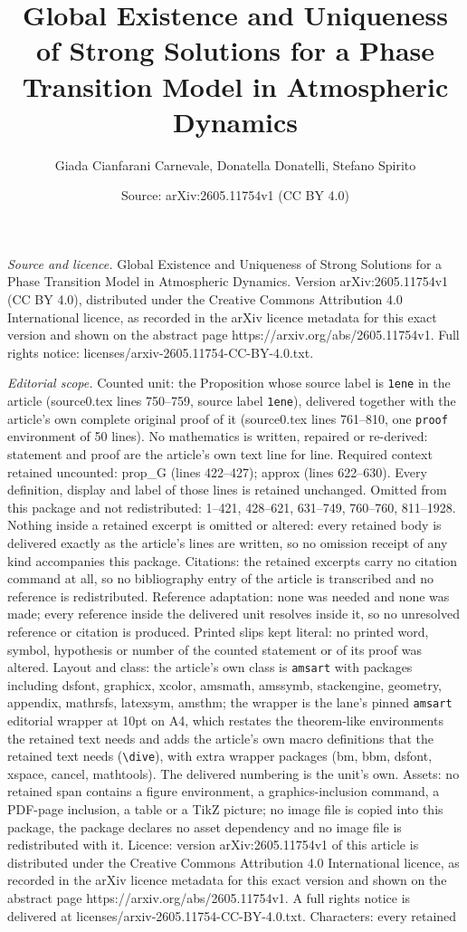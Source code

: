 \documentclass[10pt,a4paper]{amsart}
\title[Global Existence and Uniqueness of Strong Solutions for a Ph]{Global Existence and Uniqueness of Strong Solutions for a Phase Transition Model in Atmospheric Dynamics}
\author{Giada Cianfarani Carnevale, Donatella Donatelli, Stefano Spirito}
\date{Source: arXiv:2605.11754v1 (CC BY 4.0)}
\begin{document}
\maketitle

\noindent\emph{Source and licence.} Global Existence and Uniqueness of Strong Solutions for a Phase Transition Model in Atmospheric Dynamics. Version arXiv:2605.11754v1 (CC BY 4.0), distributed under the Creative Commons Attribution 4.0 International licence, as recorded in the arXiv licence metadata for this exact version and shown on the abstract page https://arxiv.org/abs/2605.11754v1. Full rights notice: licenses/arxiv-2605.11754-CC-BY-4.0.txt.\par\smallskip

\noindent\textit{Editorial scope.} Counted unit: the Proposition whose source label is \texttt{1ene} in the article (source0.tex lines 750--759, source label \texttt{1ene}), delivered together with the article's own complete original proof of it (source0.tex lines 761--810, one \texttt{proof} environment of 50 lines). No mathematics is written, repaired or re-derived: statement and proof are the article's own text line for line. Required context retained uncounted: prop\_G (lines 422--427); approx (lines 622--630). Every definition, display and label of those lines is retained unchanged. Omitted from this package and not redistributed: 1--421, 428--621, 631--749, 760--760, 811--1928. Nothing inside a retained excerpt is omitted or altered: every retained body is delivered exactly as the article's lines are written, so no omission receipt of any kind accompanies this package. Citations: the retained excerpts carry no citation command at all, so no bibliography entry of the article is transcribed and no reference is redistributed. Reference adaptation: none was needed and none was made; every reference inside the delivered unit resolves inside it, so no unresolved reference or citation is produced. Printed slips kept literal: no printed word, symbol, hypothesis or number of the counted statement or of its proof was altered. Layout and class: the article's own class is \texttt{amsart} with packages including dsfont, graphicx, xcolor, amsmath, amssymb, stackengine, geometry, appendix, mathrsfs, latexsym, amsthm; the wrapper is the lane's pinned \texttt{amsart} editorial wrapper at 10pt on A4, which restates the theorem-like environments the retained text needs and adds the article's own macro definitions that the retained text needs (\texttt{\textbackslash dive}), with extra wrapper packages (bm, bbm, dsfont, xspace, cancel, mathtools). The delivered numbering is the unit's own. Assets: no retained span contains a figure environment, a graphics-inclusion command, a PDF-page inclusion, a table or a TikZ picture; no image file is copied into this package, the package declares no asset dependency and no image file is redistributed with it. Licence: version arXiv:2605.11754v1 of this article is distributed under the Creative Commons Attribution 4.0 International licence, as recorded in the arXiv licence metadata for this exact version and shown on the abstract page https://arxiv.org/abs/2605.11754v1. A full rights notice is delivered at licenses/arxiv-2605.11754-CC-BY-4.0.txt. Characters: every retained 
\end{document}

